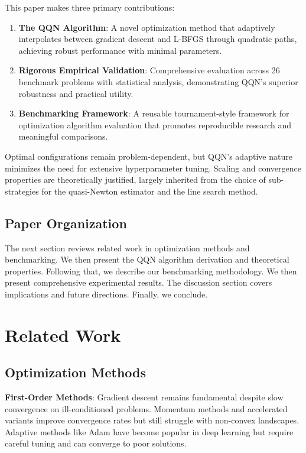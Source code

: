 This paper makes three primary contributions:

\begin{enumerate}
\def\labelenumi{\arabic{enumi}.}
\item
  \textbf{The QQN Algorithm}: A novel optimization method that adaptively interpolates between gradient descent and L-BFGS through quadratic paths, achieving robust performance with minimal parameters.
\item
  \textbf{Rigorous Empirical Validation}: Comprehensive evaluation across 26 benchmark problems with statistical analysis, demonstrating QQN's superior robustness and practical utility.
\item
  \textbf{Benchmarking Framework}: A reusable tournament-style framework for optimization algorithm evaluation that promotes reproducible research and meaningful comparisons.
\end{enumerate}

Optimal configurations remain problem-dependent, but QQN's adaptive nature minimizes the need for extensive hyperparameter tuning.
Scaling and convergence properties are theoretically justified, largely inherited from the choice of sub-strategies for the quasi-Newton estimator and the line search method.

\hypertarget{paper-organization}{%
\subsection{Paper Organization}\label{paper-organization}}

The next section reviews related work in optimization methods and benchmarking.
We then present the QQN algorithm derivation and theoretical properties.
Following that, we describe our benchmarking methodology.
We then present comprehensive experimental results.
The discussion section covers implications and future directions.
Finally, we conclude.

\hypertarget{related-work}{%
\section{Related Work}\label{related-work}}

\hypertarget{optimization-methods}{%
\subsection{Optimization Methods}\label{optimization-methods}}

\textbf{First-Order Methods}: Gradient descent \citep{cauchy1847methode} remains fundamental despite slow convergence on ill-conditioned problems.
Momentum methods \citep{polyak1964some} and accelerated variants \citep{nesterov1983method} improve convergence rates but still struggle with non-convex landscapes.
Adaptive methods like Adam \citep{kingma2015adam} have become popular in deep learning but require careful tuning and can converge to poor solutions.

